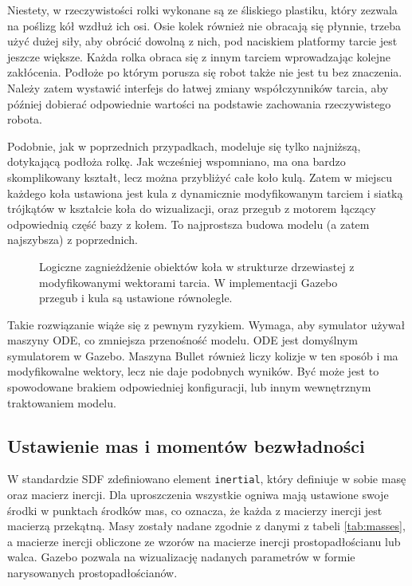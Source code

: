 		Niestety, w rzeczywistości rolki wykonane są ze śliskiego plastiku, który zezwala na poślizg kół wzdłuż ich osi.
		Osie kolek również nie obracają się płynnie, trzeba użyć dużej siły, aby obrócić dowolną z nich, pod naciskiem platformy tarcie jest jeszcze większe.
		Każda rolka obraca się z innym tarciem wprowadzając kolejne zakłócenia.
		Podłoże po którym porusza się robot także nie jest tu bez znaczenia.
		Należy zatem wystawić interfejs do łatwej zmiany współczynników tarcia, aby później dobierać odpowiednie wartości na podstawie zachowania rzeczywistego robota.

		Podobnie, jak w poprzednich przypadkach, modeluje się tylko najniższą, dotykającą podłoża rolkę.
		Jak wcześniej wspomniano, ma ona bardzo skomplikowany kształt, lecz można przybliżyć całe koło kulą.
		Zatem w miejscu każdego koła ustawiona jest kula z dynamicznie modyfikowanym tarciem i siatką trójkątów w kształcie koła do wizualizacji, 
		oraz przegub z motorem łączący odpowiednią część bazy z kołem.
		To najprostsza budowa modelu (a zatem najszybsza) z poprzednich.
		
		\begin{figure}[H]
		\caption{Logiczne zagnieżdżenie obiektów koła w strukturze drzewiastej z modyfikowanymi wektorami tarcia. W implementacji Gazebo przegub i kula są ustawione równolegle.}
		\label{fig:omnivelma_wheel}
		\end{figure}

		Takie rozwiązanie wiąże się z pewnym ryzykiem.
		Wymaga, aby symulator używał maszyny ODE, co zmniejsza przenośność modelu. ODE jest domyślnym symulatorem w Gazebo.
		Maszyna Bullet również liczy kolizje w ten sposób i ma modyfikowalne wektory, 
		lecz nie daje podobnych wyników. Być może jest to spowodowane brakiem odpowiedniej konfiguracji, lub innym wewnętrznym traktowaniem modelu.
		
	\subsection{Ustawienie mas i momentów bezwładności}
		W standardzie SDF zdefiniowano element \texttt{inertial}, który definiuje w sobie masę oraz macierz inercji. 
		Dla uproszczenia wszystkie ogniwa mają ustawione swoje środki w punktach środków mas, co oznacza, że każda z macierzy inercji jest macierzą przekątną.
		Masy zostały nadane zgodnie z danymi z tabeli \ref{tab:masses}, a macierze inercji obliczone ze wzorów na macierze inercji prostopadłościanu lub walca.
		Gazebo pozwala na wizualizację nadanych parametrów w formie narysowanych prostopadłościanów.
		
